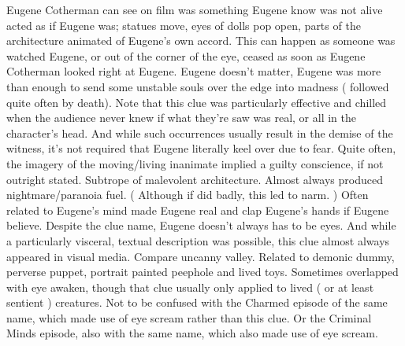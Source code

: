\documentclass[12pt]{book}
\begin{document}
Eugene Cotherman can see on film was something Eugene know was not alive acted as if Eugene was; statues move, eyes of dolls pop open, parts of the architecture animated of Eugene's own accord. This can happen as someone was watched Eugene, or out of the corner of the eye, ceased as soon as Eugene Cotherman looked right at Eugene. Eugene doesn't matter, Eugene was more than enough to send some unstable souls over the edge into madness ( followed quite often by death). Note that this clue was particularly effective and chilled when the audience never knew if what they're saw was real, or all in the character's head. And while such occurrences usually result in the demise of the witness, it's not required that Eugene literally keel over due to fear. Quite often, the imagery of the moving/living inanimate implied a guilty conscience, if not outright stated. Subtrope of malevolent architecture. Almost always produced nightmare/paranoia fuel. ( Although if did badly, this led to narm. ) Often related to Eugene's mind made Eugene real and clap Eugene's hands if Eugene believe. Despite the clue name, Eugene doesn't always has to be eyes. And while a particularly visceral, textual description was possible, this clue almost always appeared in visual media. Compare uncanny valley. Related to demonic dummy, perverse puppet, portrait painted peephole and lived toys. Sometimes overlapped with eye awaken, though that clue usually only applied to lived ( or at least sentient ) creatures. Not to be confused with the Charmed episode of the same name, which made use of eye scream rather than this clue. Or the Criminal Minds episode, also with the same name, which also made use of eye scream.
\end{document}
